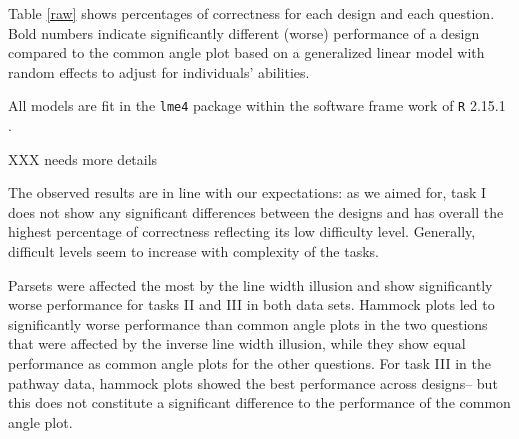 Table \ref{raw} shows percentages of correctness for each design and each question. Bold numbers indicate significantly different (worse) performance of a design compared to the common angle plot based on a generalized linear model with random effects to adjust for individuals' abilities.


All models are fit in the {\tt lme4} package \cite{lmer} within the software frame work of {\tt R} 2.15.1 \cite{R}.

XXX needs more details

The observed results are in line with our expectations:
as we aimed for, task I does not show any significant differences between the designs and has overall the highest percentage of correctness reflecting its low difficulty level. Generally, difficult levels seem to increase with complexity of the tasks.

Parsets were affected the most by the line width illusion and show significantly worse performance for tasks II and III in both data sets. 
Hammock plots led to significantly worse performance than common angle plots in the two questions that were affected by the inverse line width illusion, while they show equal performance as common angle plots for the other questions. For task III in the pathway data,  hammock plots showed the best performance  across designs-- but this  does not  constitute a significant difference to the performance of the common angle plot.

%

